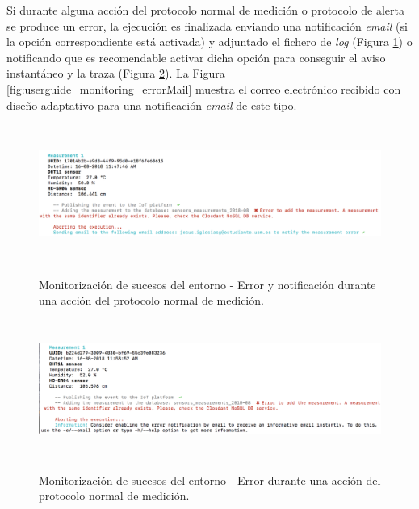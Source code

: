 \documentclass[12pt,a4paper, twoside]{report}
\begin{document}
	 Si durante alguna acción del protocolo normal de medición o protocolo de alerta se produce un error, la ejecución es finalizada enviando una notificación \textit{email} (si la opción correspondiente está activada) y adjuntado el fichero de \textit{log} (Figura \ref{fig:userguide_monitoring_errorMeasurementMail}) o notificando que es recomendable activar dicha opción para conseguir el aviso instantáneo y la traza (Figura \ref{fig:userguide_monitoring_errorMeasurement}). La Figura \ref{fig:userguide_monitoring_errorMail} muestra el correo electrónico recibido con diseño adaptativo para una notificación \textit{email} de este tipo. \\
	 
	 	 	\begin{figure}[!ht]   
				\caption{Monitorización de sucesos del entorno - Error y notificación durante una acción del protocolo normal de medición.} 
				\begin{center} 
					\includegraphics[width=15cm,height=4.5cm]{Images/userGuide/monitoring/errorMeasurementMail} \\
					\label{fig:userguide_monitoring_errorMeasurementMail} 
				\end{center}  
			\end{figure}	 
			
			\begin{figure}[!ht]   
				\caption{Monitorización de sucesos del entorno - Error durante una acción del protocolo normal de medición.} 
				\begin{center} 
					\includegraphics[width=15cm,height=4.5cm]{Images/userGuide/monitoring/errorMeasurement} \\
					\label{fig:userguide_monitoring_errorMeasurement} 
				\end{center}  
			\end{figure}	 
			
\end{document}
